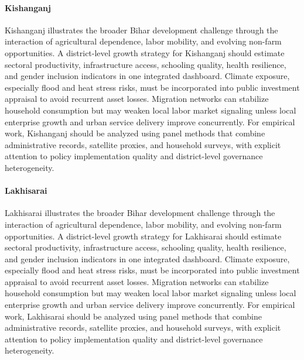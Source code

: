 \documentclass[preprint,12pt]{elsarticle}
\begin{document}
\paragraph{Kishanganj} Kishanganj illustrates the broader Bihar development challenge through the interaction of agricultural dependence, labor mobility, and evolving non-farm opportunities. A district-level growth strategy for Kishanganj should estimate sectoral productivity, infrastructure access, schooling quality, health resilience, and gender inclusion indicators in one integrated dashboard. Climate exposure, especially flood and heat stress risks, must be incorporated into public investment appraisal to avoid recurrent asset losses. Migration networks can stabilize household consumption but may weaken local labor market signaling unless local enterprise growth and urban service delivery improve concurrently. For empirical work, Kishanganj should be analyzed using panel methods that combine administrative records, satellite proxies, and household surveys, with explicit attention to policy implementation quality and district-level governance heterogeneity.

\paragraph{Lakhisarai} Lakhisarai illustrates the broader Bihar development challenge through the interaction of agricultural dependence, labor mobility, and evolving non-farm opportunities. A district-level growth strategy for Lakhisarai should estimate sectoral productivity, infrastructure access, schooling quality, health resilience, and gender inclusion indicators in one integrated dashboard. Climate exposure, especially flood and heat stress risks, must be incorporated into public investment appraisal to avoid recurrent asset losses. Migration networks can stabilize household consumption but may weaken local labor market signaling unless local enterprise growth and urban service delivery improve concurrently. For empirical work, Lakhisarai should be analyzed using panel methods that combine administrative records, satellite proxies, and household surveys, with explicit attention to policy implementation quality and district-level governance heterogeneity.
\end{document}
